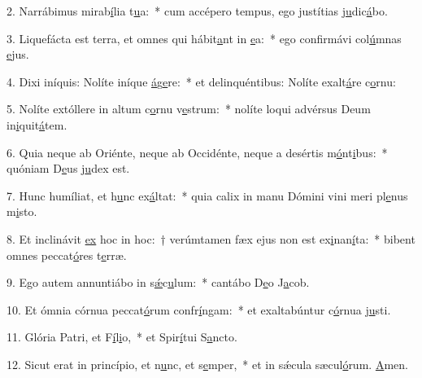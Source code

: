 2. Narrábimus mirab\uline{í}lia t\uline{u}a:~* cum accépero tempus, ego justítias j\uline{u}dic\uline{á}bo.\par 
3. Liquefácta est terra, et omnes qui hábit\uline{a}nt in \uline{e}a:~* ego confirmávi col\uline{ú}mnas \uline{e}jus.\par 
4. Dixi iníquis: Nolíte iníque \uline{á}g\uline{e}re:~* et delinquéntibus: Nolíte exalt\uline{á}re c\uline{o}rnu:\par 
5. Nolíte extóllere in altum c\uline{o}rnu v\uline{e}strum:~* nolíte loqui advérsus Deum in\uline{i}quit\uline{á}tem.\par 
6. Quia neque ab Oriénte, neque ab Occidénte, neque a desértis m\uline{ó}nt\uline{i}bus:~* quóniam D\uline{e}us j\uline{u}dex est.\par 
7. Hunc humíliat, et h\uline{u}nc ex\uline{á}ltat:~* quia calix in manu Dómini vini meri pl\uline{e}nus m\uline{i}sto.\par 
8. Et inclinávit \uline{ex} hoc in hoc:~† verúmtamen fæx ejus non est ex\uline{i}nan\uline{í}ta:~* bibent omnes peccat\uline{ó}res t\uline{e}rræ.\par 
9. Ego autem annuntiábo in s\uline{ǽ}c\uline{u}lum:~* cantábo D\uline{e}o J\uline{a}cob.\par 
10. Et ómnia córnua peccat\uline{ó}rum confr\uline{í}ngam:~* et exaltabúntur c\uline{ó}rnua j\uline{u}sti.\par 
11. Glória Patri, et F\uline{í}l\uline{i}o,~* et Spir\uline{í}tui S\uline{a}ncto.\par 
12. Sicut erat in princípio, et n\uline{u}nc, et s\uline{e}mper,~* et in sǽcula sæcul\uline{ó}rum. \uline{A}men.\par 
